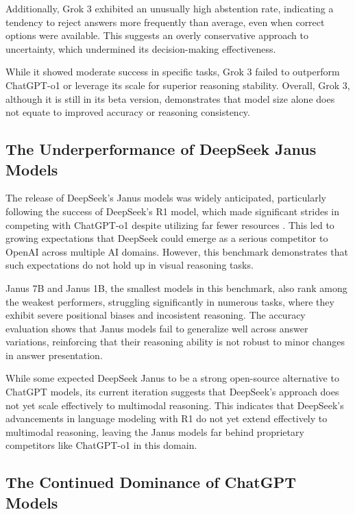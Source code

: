 Additionally, Grok 3 exhibited an unusually high abstention rate, indicating a tendency to reject answers more frequently than average, even when correct options were available. This suggests an overly conservative approach to uncertainty, which undermined its decision-making effectiveness.

While it showed moderate success in specific tasks, Grok 3 failed to outperform ChatGPT-o1 or leverage its scale for superior reasoning stability. Overall, Grok 3, although it is still in its beta version, demonstrates that model size alone does not equate to improved accuracy or reasoning consistency.

\subsection{The Underperformance of DeepSeek Janus Models}

The release of DeepSeek’s Janus models was widely anticipated, particularly following the success of DeepSeek’s R1 model, which made significant strides in competing with ChatGPT-o1 despite utilizing far fewer resources \cite{guo2025deepseek}. This led to growing expectations that DeepSeek could emerge as a serious competitor to OpenAI across multiple AI domains. However, this benchmark demonstrates that such expectations do not hold up in visual reasoning tasks. 

Janus 7B and Janus 1B, the smallest models in this benchmark, also rank among the weakest performers, struggling significantly in numerous tasks, where they exhibit severe positional biases and incosistent reasoning. The accuracy evaluation shows that Janus models fail to generalize well across answer variations, reinforcing that their reasoning ability is not robust to minor changes in answer presentation.

While some expected DeepSeek Janus to be a strong open-source alternative to ChatGPT models, its current iteration suggests that DeepSeek’s approach does not yet scale effectively to multimodal reasoning. This indicates that DeepSeek’s advancements in language modeling with R1 do not yet extend effectively to multimodal reasoning, leaving the Janus models far behind proprietary competitors like ChatGPT-o1 in this domain.

\subsection{The Continued Dominance of ChatGPT Models}

